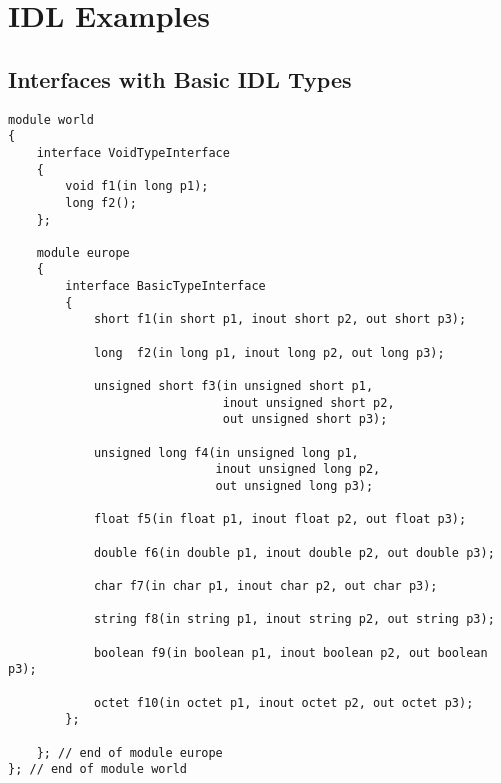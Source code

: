 \chapter{IDL Examples}

\section{Interfaces with Basic IDL Types}

\begin{small}
\begin{verbatim}
module world 
{
    interface VoidTypeInterface 
    {
        void f1(in long p1);
        long f2();
    };

    module europe 
    {
        interface BasicTypeInterface 
        {
            short f1(in short p1, inout short p2, out short p3);

            long  f2(in long p1, inout long p2, out long p3);

            unsigned short f3(in unsigned short p1, 
                              inout unsigned short p2, 
                              out unsigned short p3);

            unsigned long f4(in unsigned long p1, 
                             inout unsigned long p2, 
                             out unsigned long p3);

            float f5(in float p1, inout float p2, out float p3);

            double f6(in double p1, inout double p2, out double p3);

            char f7(in char p1, inout char p2, out char p3);

            string f8(in string p1, inout string p2, out string p3);

            boolean f9(in boolean p1, inout boolean p2, out boolean p3);

            octet f10(in octet p1, inout octet p2, out octet p3);
        };

    }; // end of module europe
}; // end of module world
\end{verbatim}
\end{small}


